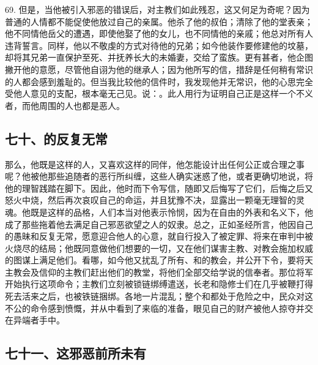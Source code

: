 69. 但是，当他被引入邪恶的错误后，对主教们如此残忍，这又何足为奇呢？因为普通的人情都不能促使他放过自己的亲属。他杀了他的叔伯；清除了他的堂表亲；他不同情他岳父的遭遇，即使他娶了他的女儿，也不同情他的亲戚；他总对所有人违背誓言。同样，他以不敬虔的方式对待他的兄弟；如今他装作要修建他的坟墓，却将其兄弟一直保护至死、并抚养长大的未婚妻，交给了蛮族。更有甚者，他企图撇开他的意愿，尽管他自诩为他的继承人；因为他所写的信，措辞是任何稍有常识的人都会感到羞耻的。但当我比较他的信件时，我发现他并无常识，他的心思完全受他人意见的支配，根本毫无己见。说：。此人用行为证明自己正是这样一个不义者，而他周围的人也都是恶人。\par


\subsection{七十、的反复无常}

那么，他既是这样的人，又喜欢这样的同伴，他怎能设计出任何公正或合理之事呢？他被他那些追随者的恶行所纠缠，这些人确实迷惑了他，或者更确切地说，将他的理智践踏在脚下。因此，他时而下令写信，随即又后悔写了它们，后悔之后又怒火中烧，然后再次哀叹自己的命运，并且犹豫不决，显露出一颗毫无理智的灵魂。他既是这样的品格，人们本当对他表示怜悯，因为在自由的外表和名义下，他成了那些拖着他去满足自己邪恶欲望之人的奴隶。总之，正如圣经所言，他因自己的愚昧和反复无常，愿意迎合他人的心意，就自行投入了被定罪、将来在审判中被火烧尽的结局；他既同意做他们想要的一切，又在他们谋害主教、对教会施加权威的图谋上满足他们。看哪，如今他又扰乱了所有、和的教会，并公开下令，要将天主教会及信仰的主教们赶出他们的教堂，将他们全部交给学说的信奉者。那位将军开始执行这项命令；主教们立刻被锁链绑缚遣送，长老和隐修士们在几乎被鞭打得死去活来之后，也被铁链捆绑。各地一片混乱；整个和都处于危险之中，民众对这不公的命令感到愤慨，并从中看到了来临的准备，眼见自己的财产被他人掠夺并交在异端者手中。\par


\subsection{七十一、这邪恶前所未有}

